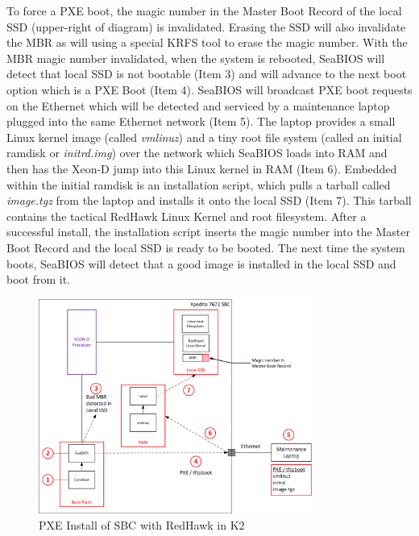 \documentclass[12pt]{article}
\begin{document}
To force a PXE boot, the magic number in the Master Boot Record of the local SSD
(upper-right of diagram) is invalidated.  Erasing the SSD will also invalidate the
MBR as will using a special KRFS tool to erase the magic number.  With the MBR
magic number invalidated, when the system is rebooted, SeaBIOS will detect that
local SSD is not bootable (Item 3) and will advance to the next boot option
which is a PXE Boot (Item 4).  SeaBIOS will broadcast PXE boot requests on the
Ethernet which will be detected and serviced by a maintenance laptop plugged
into the same Ethernet network (Item 5).  The laptop provides a small Linux
kernel image (called \emph{vmlinuz}) and a tiny root file system (called an
initial ramdisk or \emph{initrd.img}) over the network which SeaBIOS loads into
RAM and then has the Xeon-D jump into this Linux kernel in RAM (Item 6).
Embedded within the initial ramdisk is an installation script, which pulls a
tarball called \emph{image.tgz} from the laptop and installs it onto the local
SSD (Item 7).  This tarball contains the tactical RedHawk Linux Kernel and root
filesystem.  After a successful install, the installation script inserts the
magic number into the Master Boot Record and the local SSD is ready to be
booted.  The next time the system boots, SeaBIOS will detect that a good image
is installed in the local SSD and boot from it.

\begin{figure}[H]
    \begin{center}
    \includegraphics[width=0.8\textwidth]{img/pxe_install}
    \caption{PXE Install of SBC with RedHawk in K2}
    \label{fig:pxe_install}
    \end{center}
\end{figure}
\end{document}
